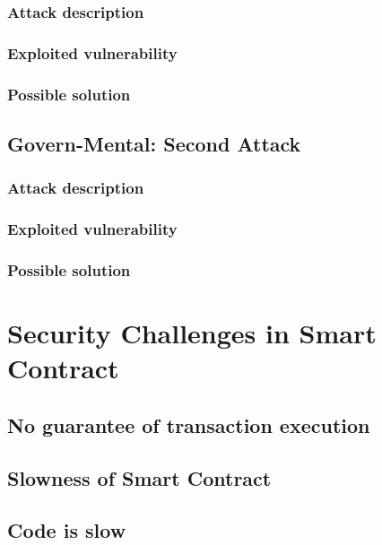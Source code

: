 \subsubsection{Attack description}
\subsubsection{Exploited vulnerability}
\subsubsection{Possible solution}

\subsection{Govern-Mental: Second Attack}
\subsubsection{Attack description}
\subsubsection{Exploited vulnerability}
\subsubsection{Possible solution}

\section{Security Challenges in Smart Contract}
\subsection{No guarantee of transaction execution}
\subsection{Slowness of Smart Contract}
\subsection{Code is slow}

